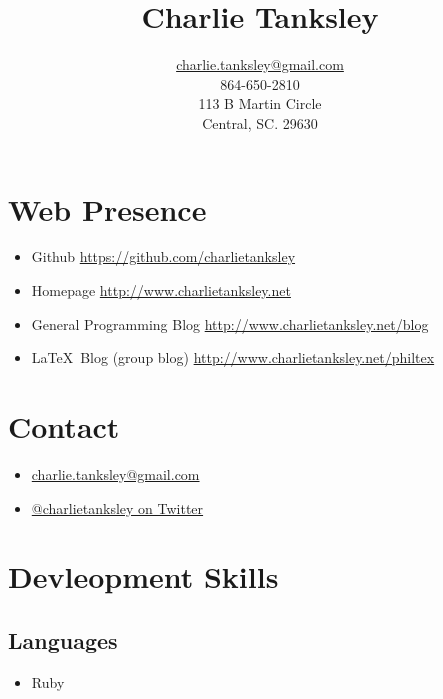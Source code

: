\documentclass{article}
\title{Charlie Tanksley}
\author{\href{mailto:charlie.tanksley@gmail.com}{charlie.tanksley@gmail.com}\\
        864-650-2810\\
        113 B Martin Circle\\
        Central, SC. 29630}
\date{\nodate}
\begin{document}
\setlength{\droptitle}{-1in}
\maketitle
\thispagestyle{fancy}

\section{Web Presence} %
\label{sec:Web Presence}

\begin{itemize}
  \item Github 
    \href{https://github.com/charlietanksley}{https://github.com/charlietanksley}
  \item Homepage 
    \href{http://www.charlietanksley.net}{http://www.charlietanksley.net}
  \item General Programming Blog
    \href{http://www.charlietanksley.net/blog}{http://www.charlietanksley.net/blog}
  \item \LaTeX\ Blog (group blog)
    \href{http://www.charlietanksley.net/philtex}{http://www.charlietanksley.net/philtex}
\end{itemize}

\section{Contact} %
\label{sec:Contact}

\begin{itemize}
  \item 
    \href{mailto:charlie.tanksley@gmail.com}{charlie.tanksley@gmail.com}
  \item \href{http://www.twitter.com/charlietanksley}{@charlietanksley 
    on Twitter}
\end{itemize}

\section{Devleopment Skills} %
\label{sec:Devleopment Skills}

\subsection{Languages} %
\label{sub:Languages}

\begin{itemize}
  \item Ruby
\end{itemize}
\end{document}
